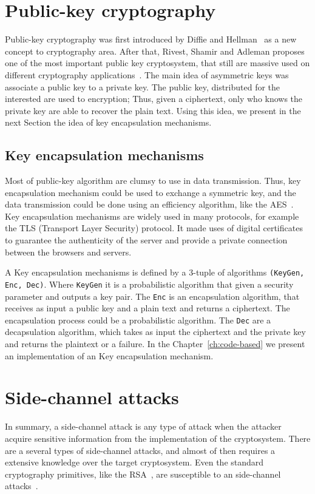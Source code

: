 \section{Public-key cryptography}
Public-key cryptography was first introduced by Diffie and Hellman~\cite{diffie1976new} as a new concept to cryptography area. After that, Rivest, Shamir and Adleman proposes one of the most important public key cryptosystem, that still are massive used on different cryptography applications~\cite{rivest1978method}. The main idea of asymmetric keys was associate a public key to a private key. The public key, distributed for the interested are used to encryption; Thus, given a ciphertext, only who knows the private key are able to recover the plain text. Using this idea, we present in the next Section the idea of key encapsulation mechanisms.

\subsection{Key encapsulation mechanisms}
Most of public-key algorithm are clumsy to use in data transmission. Thus, key encapsulation mechanism could be used to exchange a symmetric key, and the data transmission could be done using an efficiency algorithm, like the AES~\cite{daemen2013design}. Key encapsulation mechanisms are widely used in many protocols, for example the TLS (Transport Layer Security) protocol. It made uses of digital certificates to guarantee the authenticity of the server and provide a private connection between the browsers and servers.

A Key encapsulation mechanisms is defined by a 3-tuple of algorithms \texttt{(KeyGen, Enc, Dec)}. Where \texttt{KeyGen} it is a probabilistic algorithm that given a security parameter and outputs a key pair. The \texttt{Enc} is an encapsulation algorithm, that receives as input a public key and a plain text and returns a ciphertext. The encapsulation process could be a probabilistic algorithm. The \texttt{Dec} are a decapsulation algorithm, which takes as input the ciphertext and the private key and returns the plaintext or a failure. In the Chapter~\ref{ch:code-based} we present an implementation of an Key encapsulation mechanism.

\section{Side-channel attacks}
In summary, a side-channel attack is any type of attack when the attacker acquire sensitive information from the implementation of the cryptosystem. There are a several types of side-channel attacks, and almost of then requires a extensive knowledge over the target cryptosystem. Even the standard cryptography primitives, like the RSA~\cite{rivest1978method}, are susceptible to an side-channel attacks~\cite{kocher1996timing}. 

